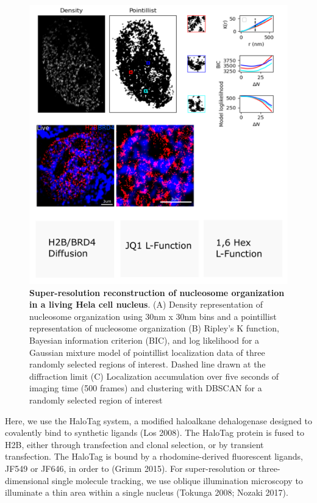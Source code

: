 \documentclass{ucetd}
\begin{document}
\begin{figure}
\begin{center}
\includegraphics[width=16cm]{BRD4-SR.png}
\end{center}
\caption{\textbf{Super-resolution reconstruction of nucleosome organization in a living Hela cell nucleus}. (A) Density representation of nucleosome organization using 30nm x 30nm bins and a pointillist representation of nucleosome organization (B) Ripley's K function, Bayesian information criterion (BIC), and log likelihood for a Gaussian mixture model of pointillist localization data of three randomly selected regions of interest. Dashed line drawn at the diffraction limit (C) Localization accumulation over five seconds of imaging time (500 frames) and clustering with DBSCAN for a randomly selected region of interest}
\end{figure}

Here, we use the HaloTag system, a modified haloalkane dehalogenase designed to covalently bind to synthetic ligands  (Los 2008). The HaloTag protein is fused to H2B, either through transfection and clonal selection, or by transient transfection. The HaloTag is bound by a rhodomine-derived fluorescent ligands, JF549 or JF646, in order to (Grimm 2015). For super-resolution or three-dimensional single molecule tracking, we use oblique illumination microscopy to illuminate a thin area within a single nucleus (Tokunga 2008; Nozaki 2017). 
\end{document}
